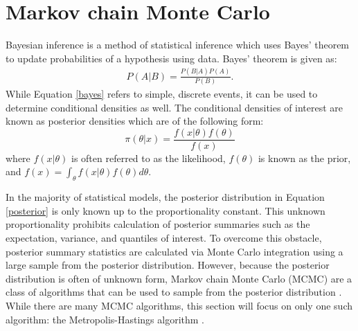 \section{Markov chain Monte Carlo}

Bayesian inference is a method of statistical inference which uses Bayes' theorem to update probabilities of a hypothesis using data. Bayes' theorem is given as:
\begin{align}
\label{bayes}
P(A|B) =  \frac{ P(B |A) P(A) }{P(B)}.
\end{align}
 While Equation \ref{bayes} refers to simple, discrete events, it can be used to determine conditional densities as well. The conditional densities of interest are known as posterior densities which are of the following form:
\begin{equation}
\label{posterior}
\pi(\theta|x) = \frac{f(x|\theta) f(\theta)}{f(x)}
\end{equation}
where $f(x|\theta)$ is often referred to as the likelihood, $f(\theta)$ is known as the prior, and \newline $f(x)=\int_{\theta}f(x|\theta)f(\theta)d\theta$.

In the majority of statistical models, the posterior distribution in Equation \eqref{posterior} is only known up to the proportionality constant. This unknown proportionality prohibits calculation of posterior summaries such as the expectation, variance, and quantiles of interest. To overcome this obstacle, posterior summary statistics are calculated via Monte Carlo integration using a large sample from the posterior distribution. However, because the posterior distribution is often of unknown form, Markov chain Monte Carlo (MCMC) are a class of algorithms that can be used to sample from the posterior distribution \citep[see][]{robert04,gamerman06}.  While there are many MCMC algorithms, this section will focus on only one such algorithm: the Metropolis-Hastings algorithm \citep{metropolis53,hastings70,greenburg95}.


